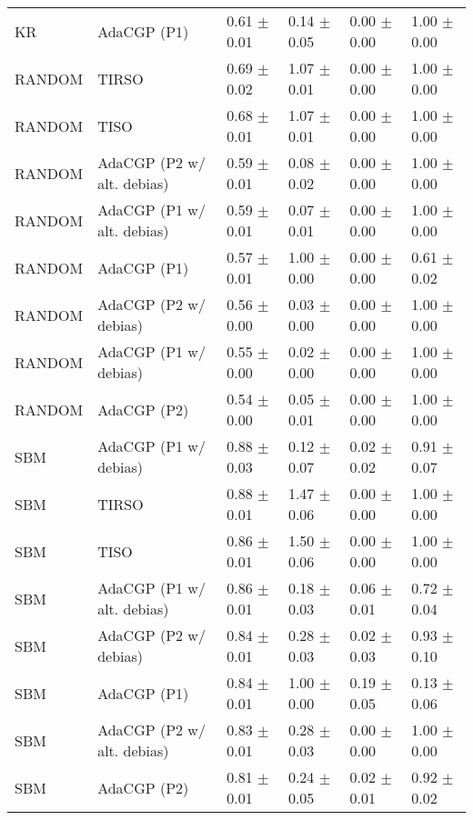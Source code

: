 \begin{tabular}{llllll}
KR     &                 AdaCGP (P1) &  0.61 $\pm$ 0.01 &  0.14 $\pm$ 0.05 &  0.00 $\pm$ 0.00 &  1.00 $\pm$ 0.00 \\
RANDOM &                       TIRSO &  0.69 $\pm$ 0.02 &  1.07 $\pm$ 0.01 &  0.00 $\pm$ 0.00 &  1.00 $\pm$ 0.00 \\
RANDOM &                        TISO &  0.68 $\pm$ 0.01 &  1.07 $\pm$ 0.01 &  0.00 $\pm$ 0.00 &  1.00 $\pm$ 0.00 \\
RANDOM &  AdaCGP (P2 w/ alt. debias) &  0.59 $\pm$ 0.01 &  0.08 $\pm$ 0.02 &  0.00 $\pm$ 0.00 &  1.00 $\pm$ 0.00 \\
RANDOM &  AdaCGP (P1 w/ alt. debias) &  0.59 $\pm$ 0.01 &  0.07 $\pm$ 0.01 &  0.00 $\pm$ 0.00 &  1.00 $\pm$ 0.00 \\
RANDOM &                 AdaCGP (P1) &  0.57 $\pm$ 0.01 &  1.00 $\pm$ 0.00 &  0.00 $\pm$ 0.00 &  0.61 $\pm$ 0.02 \\
RANDOM &       AdaCGP (P2 w/ debias) &  0.56 $\pm$ 0.00 &  0.03 $\pm$ 0.00 &  0.00 $\pm$ 0.00 &  1.00 $\pm$ 0.00 \\
RANDOM &       AdaCGP (P1 w/ debias) &  0.55 $\pm$ 0.00 &  0.02 $\pm$ 0.00 &  0.00 $\pm$ 0.00 &  1.00 $\pm$ 0.00 \\
RANDOM &                 AdaCGP (P2) &  0.54 $\pm$ 0.00 &  0.05 $\pm$ 0.01 &  0.00 $\pm$ 0.00 &  1.00 $\pm$ 0.00 \\
SBM    &       AdaCGP (P1 w/ debias) &  0.88 $\pm$ 0.03 &  0.12 $\pm$ 0.07 &  0.02 $\pm$ 0.02 &  0.91 $\pm$ 0.07 \\
SBM    &                       TIRSO &  0.88 $\pm$ 0.01 &  1.47 $\pm$ 0.06 &  0.00 $\pm$ 0.00 &  1.00 $\pm$ 0.00 \\
SBM    &                        TISO &  0.86 $\pm$ 0.01 &  1.50 $\pm$ 0.06 &  0.00 $\pm$ 0.00 &  1.00 $\pm$ 0.00 \\
SBM    &  AdaCGP (P1 w/ alt. debias) &  0.86 $\pm$ 0.01 &  0.18 $\pm$ 0.03 &  0.06 $\pm$ 0.01 &  0.72 $\pm$ 0.04 \\
SBM    &       AdaCGP (P2 w/ debias) &  0.84 $\pm$ 0.01 &  0.28 $\pm$ 0.03 &  0.02 $\pm$ 0.03 &  0.93 $\pm$ 0.10 \\
SBM    &                 AdaCGP (P1) &  0.84 $\pm$ 0.01 &  1.00 $\pm$ 0.00 &  0.19 $\pm$ 0.05 &  0.13 $\pm$ 0.06 \\
SBM    &  AdaCGP (P2 w/ alt. debias) &  0.83 $\pm$ 0.01 &  0.28 $\pm$ 0.03 &  0.00 $\pm$ 0.00 &  1.00 $\pm$ 0.00 \\
SBM    &                 AdaCGP (P2) &  0.81 $\pm$ 0.01 &  0.24 $\pm$ 0.05 &  0.02 $\pm$ 0.01 &  0.92 $\pm$ 0.02 \\
\bottomrule
\end{tabular}
